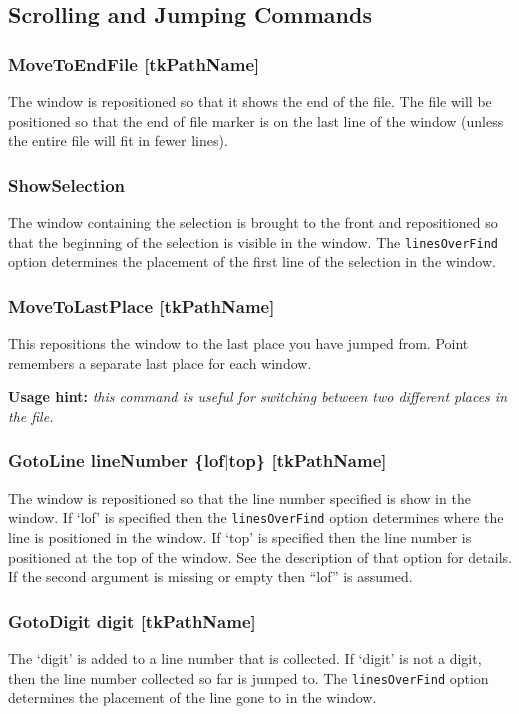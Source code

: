 \subsection{Scrolling and Jumping Commands}

\subsubsection{MoveToEndFile [tkPathName]}
The window is repositioned so that it shows the end of the file.
The file will be positioned so that the end of file marker is
on the last line of the window (unless the entire file will
fit in fewer lines).

\subsubsection{ShowSelection}
The window containing the selection is brought to the front and
repositioned so that the beginning of the selection is visible
in the window.
The {\tt linesOverFind} option determines the placement of the first
line of the selection in the window.

\subsubsection{MoveToLastPlace [tkPathName]}
This repositions the window to the last place you have jumped from.
Point remembers a separate last place for each window.

{\bf Usage hint:} {\it this command is useful for switching between
two different places in the file.}

\subsubsection{GotoLine lineNumber \{lof$\mid$top\} [tkPathName]}
The window is repositioned so that the line number specified
is show in the window.
If `lof' is specified then the {\tt linesOverFind} option
determines where the line is positioned in the window.
If `top' is specified then the line number is positioned 
at the top of the window.
See the description of that option for details.
If the second argument is missing or empty then ``lof''
is assumed.

\subsubsection{GotoDigit digit [tkPathName]}
The `digit' is added to a line number that is collected.
If `digit' is not a digit, then the line number collected
so far is jumped to.
The {\tt linesOverFind} option determines the placement
of the line gone to in the window.

